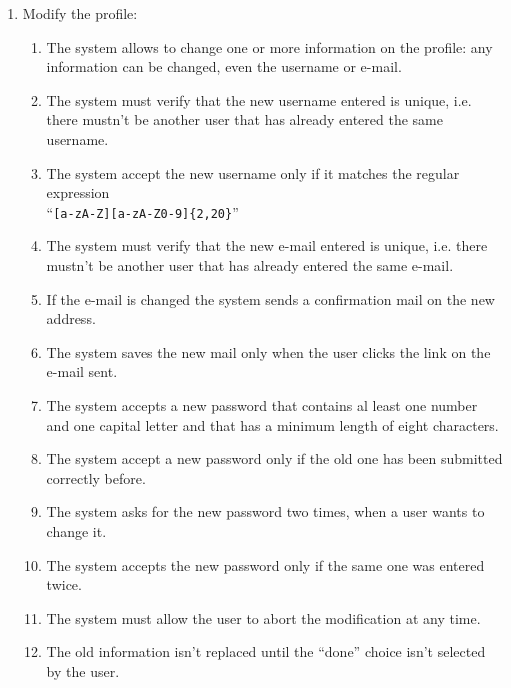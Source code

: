 \begin{enumerate}
\item Modify the profile:
\begin{enumerate}
\item The system allows to change one or more information on the profile: any information can be changed, even the username or e-mail. 
\item The system must verify that the new username entered is unique, i.e. there mustn't be another user that has already entered the same username.  \label{f-modify-usrn1}
\item  The system accept the new username only if it matches the regular expression\\``\texttt{[a-zA-Z][a-zA-Z0-9]\{2,20\}}''   \label{f-modify-usrn2} 
\item The system must verify that the new e-mail entered is unique, i.e. there mustn't be another user that has already entered the same e-mail.   \label{f-modify-mail1}
\item If the e-mail is changed the system sends a confirmation mail on the new address.
\item The system saves the new mail only when the user clicks the link on the e-mail sent.   \label{f-modify-mail2}
\item The system accepts a new password that contains al least one number and one capital letter and that has a minimum length of eight characters.   \label{f-modify-pswd1}
\item The system accept a new password only if the old one has been submitted correctly before.  \label{f-modify-pswd2}
\item The system asks for the new password two times, when a user wants to change it. 
\item The system accepts the new password only if the same one was entered twice.  \label{f-modify-pswd3}
\item The system must allow the user to abort the modification at any time.
\item The old information isn't  replaced until the ``done'' choice isn't selected by the user.
\end{enumerate}




\end{enumerate}





